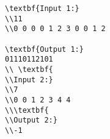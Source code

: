 \begin{verbatim}
\textbf{Input 1:}
\\11
\\0 0 0 0 1 2 3 0 0 1 2

\textbf{Output 1:}
01110112101
\\ \textbf{
\\Input 2:}
\\7
\\0 0 1 2 3 4 4
\\\textbf{
\\Output 2:}
\\-1\end{verbatim}